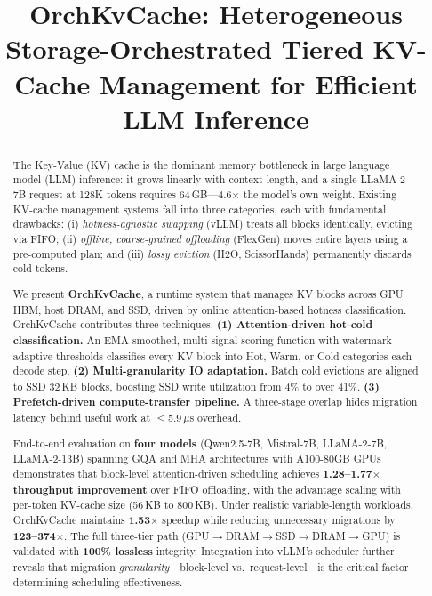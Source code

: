 \documentclass[conference]{IEEEtran}
\begin{document}
\title{OrchKvCache: Heterogeneous Storage-Orchestrated Tiered KV-Cache Management for Efficient LLM Inference}

\author{
}

\maketitle

\begin{abstract}
The Key-Value (KV) cache is the dominant memory bottleneck in large language model (LLM) inference: it grows linearly with context length, and a single LLaMA-2-7B request at 128K tokens requires 64\,GB---4.6$\times$ the model's own weight. Existing KV-cache management systems fall into three categories, each with fundamental drawbacks: (i) \emph{hotness-agnostic swapping} (vLLM) treats all blocks identically, evicting via FIFO; (ii) \emph{offline, coarse-grained offloading} (FlexGen) moves entire layers using a pre-computed plan; and (iii) \emph{lossy eviction} (H2O, ScissorHands) permanently discards cold tokens.

We present \textbf{OrchKvCache}, a runtime system that manages KV blocks across GPU HBM, host DRAM, and SSD, driven by online attention-based hotness classification. OrchKvCache contributes three techniques. \textbf{(1) Attention-driven hot-cold classification.} An EMA-smoothed, multi-signal scoring function with watermark-adaptive thresholds classifies every KV block into Hot, Warm, or Cold categories each decode step. \textbf{(2) Multi-granularity IO adaptation.} Batch cold evictions are aligned to SSD 32\,KB blocks, boosting SSD write utilization from 4\% to over 41\%. \textbf{(3) Prefetch-driven compute-transfer pipeline.} A three-stage overlap hides migration latency behind useful work at $\leq$5.9\,$\mu$s overhead.

End-to-end evaluation on \textbf{four models} (Qwen2.5-7B, Mistral-7B, LLaMA-2-7B, LLaMA-2-13B) spanning GQA and MHA architectures with A100-80GB GPUs demonstrates that block-level attention-driven scheduling achieves \textbf{1.28--1.77$\times$ throughput improvement} over FIFO offloading, with the advantage scaling with per-token KV-cache size (56\,KB to 800\,KB). Under realistic variable-length workloads, OrchKvCache maintains \textbf{1.53$\times$} speedup while reducing unnecessary migrations by \textbf{123--374$\times$}. The full three-tier path (GPU$\to$DRAM$\to$SSD$\to$DRAM$\to$GPU) is validated with \textbf{100\% lossless} integrity. Integration into vLLM's scheduler further reveals that migration \emph{granularity}---block-level vs.\ request-level---is the critical factor determining scheduling effectiveness.
\end{abstract}
\end{document}
